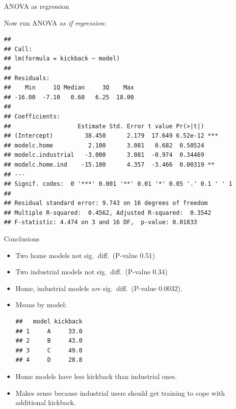 \begin{frame}[fragile]{ANOVA as regression}

  Now run ANOVA \emph{as if regression}:

  {\scriptsize
\begin{knitrout}
\color{fgcolor}\begin{kframe}
\begin{alltt}
\hlkwb{=}\hlopt{~}
\end{alltt}
\begin{verbatim}
## 
## Call:
## lm(formula = kickback ~ model)
## 
## Residuals:
##    Min     1Q Median     3Q    Max 
## -16.00  -7.10   0.60   6.25  18.00 
## 
## Coefficients:
##                   Estimate Std. Error t value Pr(>|t|)    
## (Intercept)         38.450      2.179  17.649 6.52e-12 ***
## modelc.home          2.100      3.081   0.682  0.50524    
## modelc.industrial   -3.000      3.081  -0.974  0.34469    
## modelc.home.ind    -15.100      4.357  -3.466  0.00319 ** 
## ---
## Signif. codes:  0 '***' 0.001 '**' 0.01 '*' 0.05 '.' 0.1 ' ' 1
## 
## Residual standard error: 9.743 on 16 degrees of freedom
## Multiple R-squared:  0.4562,	Adjusted R-squared:  0.3542 
## F-statistic: 4.474 on 3 and 16 DF,  p-value: 0.01833
\end{verbatim}
\end{kframe}
\end{knitrout}
}

\end{frame}

\begin{frame}[fragile]{Conclusions}
  
  \begin{itemize}
  \item Two home models not sig.\ diff.\ (P-value 0.51)
  \item Two industrial models not sig.\ diff.\ (P-value 0.34)
  \item Home, industrial
    models \emph{are} sig.\ diff.\ (P-value 0.0032).
  \item Means by model:
\begin{knitrout}
\color{fgcolor}\begin{kframe}
\begin{alltt}
\hlopt{~}
\end{alltt}
\begin{verbatim}
##   model kickback
## 1     A     33.0
## 2     B     43.0
## 3     C     49.0
## 4     D     28.8
\end{verbatim}
\end{kframe}
\end{knitrout}
\item Home models have less kickback than industrial ones.
\item Makes sense because industrial users should get training to cope
  with additional kickback.
  \end{itemize}
  
\end{frame}

